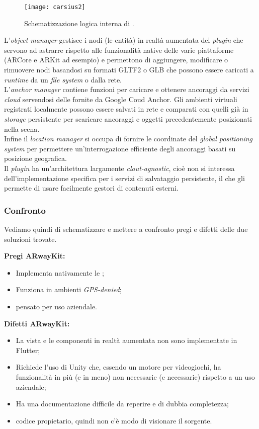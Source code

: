 \begin{figure}[H]
  \centering
  \texttt{[image: carsius2]}
  \caption[Schema \aplug{}]{Schematizzazione logica interna di \aplug{}.\footnotemark}
\end{figure}

L'\textit{object manager} gestisce i nodi (le entità) in realtà aumentata del \textit{plugin} che servono ad astrarre rispetto alle funzionalità native delle varie piattaforme (ARCore e ARKit ad esempio) e permettono di aggiungere, modificare o rimuovere nodi basandosi su formati GLTF2 o GLB che possono essere caricati a \textit{runtime} da un \textit{file system} o dalla rete.\\
L'\textit{anchor manager} contiene funzioni per caricare e ottenere ancoraggi da servizi \textit{cloud} servendosi delle \api{} fornite da Google Coud Anchor. Gli ambienti virtuali registrati localmente possono essere salvati in rete e comparati con quelli già in \textit{storage} persistente per scaricare ancoraggi e oggetti precedentemente posizionati nella scena.\\
Infine il \textit{location manager} si occupa di fornire le coordinate del \textit{global positioning system}  per permettere un'interrogazione efficiente degli ancoraggi basati su posizione geografica.\\
Il \textit{plugin} ha un'architettura largamente \textit{clout-agnostic}, cioè non si interessa dell'implementazione specifica per i servizi di salvataggio persistente, il che gli permette di usare facilmente gestori di contenuti esterni.

\subsubsection{Confronto}
Vediamo quindi di schematizzare e mettere a confronto pregi e difetti delle due soluzioni trovate.\aCapo{}

\textbf{Pregi ARwayKit:}
\begin{itemize}
  \item Implementa nativamente le \asa{};
  \item Funziona in ambienti \textit{GPS-denied};
  \item \e pensato per uso aziendale.
\end{itemize}

\textbf{Difetti ARwayKit:}
\begin{itemize}
  \item La vista e le componenti in realtà aumentata non sono implementate in Flutter;
  \item Richiede l'uso di Unity che, essendo un motore per videogiochi, ha funzionalità in più (e in meno) non necessarie (e necessarie) rispetto a un uso aziendale;
  \item Ha una documentazione difficile da reperire e di dubbia completezza;
  \item \e codice propietario, quindi non c'è modo di visionare il sorgente.
\end{itemize}

